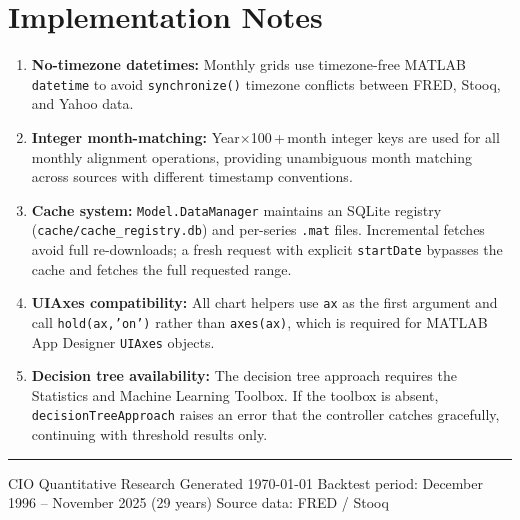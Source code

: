 \documentclass[11pt, a4paper]{article}
\begin{document}
\section*{Implementation Notes}
\label{sec:impl}

\begin{enumerate}[leftmargin=2em]
  \item \textbf{No-timezone datetimes:} Monthly grids use timezone-free
        MATLAB \texttt{datetime} to avoid \texttt{synchronize()} timezone
        conflicts between FRED, Stooq, and Yahoo data.

  \item \textbf{Integer month-matching:} Year$\times$100\,+\,month integer
        keys are used for all monthly alignment operations, providing
        unambiguous month matching across sources with different timestamp
        conventions.

  \item \textbf{Cache system:} \texttt{Model.DataManager} maintains an
        SQLite registry (\texttt{cache/cache\_registry.db}) and per-series
        \texttt{.mat} files. Incremental fetches avoid full re-downloads;
        a fresh request with explicit \texttt{startDate} bypasses the cache
        and fetches the full requested range.

  \item \textbf{UIAxes compatibility:} All chart helpers use \texttt{ax}
        as the first argument and call \texttt{hold(ax,'on')} rather than
        \texttt{axes(ax)}, which is required for MATLAB App Designer
        \texttt{UIAxes} objects.

  \item \textbf{Decision tree availability:} The decision tree approach
        requires the Statistics and Machine Learning Toolbox. If the
        toolbox is absent, \texttt{decisionTreeApproach} raises an error
        that the controller catches gracefully, continuing with threshold
        results only.
\end{enumerate}

\vfill
\noindent\rule{\linewidth}{0.4pt}
\begin{center}
\small\textcolor{cgray}{%
  CIO Quantitative Research \textbar{} Generated \today \textbar{}
  Backtest period: December 1996 -- November 2025 (29 years) \textbar{}
  Source data: FRED / Stooq
}
\end{center}
\end{document}
